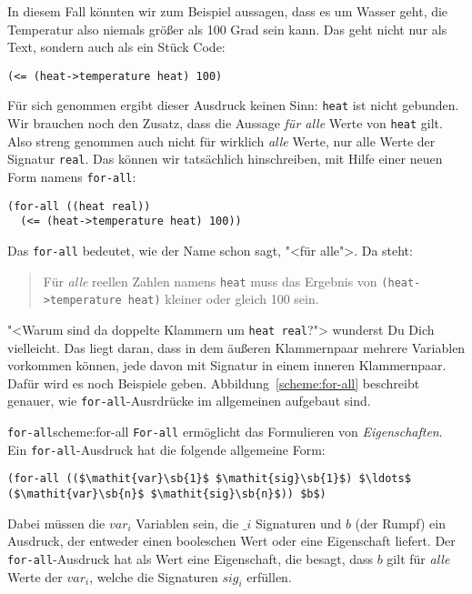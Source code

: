 In diesem Fall könnten wir zum Beispiel aussagen, dass es um Wasser
geht, die Temperatur also niemals größer als 100 Grad sein kann.  Das
geht nicht nur als Text, sondern auch als ein Stück Code:
%
\begin{lstlisting}
(<= (heat->temperature heat) 100)
\end{lstlisting}
%
Für sich genommen ergibt dieser Ausdruck keinen Sinn: \lstinline{heat}
ist nicht gebunden.  Wir brauchen noch den Zusatz, dass die Aussage
\emph{für alle} Werte von \lstinline{heat} gilt.  Also streng genommen
auch nicht für wirklich \emph{alle} Werte, nur alle Werte der Signatur
\lstinline{real}. Das können wir tatsächlich hinschreiben, mit Hilfe
einer neuen Form namens \lstinline{for-all}:
%
\begin{lstlisting}
(for-all ((heat real))
  (<= (heat->temperature heat) 100))
\end{lstlisting}
%
Das \lstinline{for-all} 
bedeutet, wie der Name schon sagt, "<für alle">.  Da steht:
%
\begin{quote}
  Für \emph{alle} reellen Zahlen namens \lstinline{heat} muss das
  Ergebnis von \lstinline{(heat->temperature heat)} kleiner oder
  gleich 100 sein.
\end{quote}
%
"<Warum sind da doppelte Klammern um \lstinline{heat real}?"> wunderst
Du Dich vielleicht.  Das liegt daran, dass in dem äußeren Klammernpaar
mehrere Variablen vorkommen können, jede davon mit Signatur in einem
inneren Klammernpaar.  Dafür wird es noch Beispiele geben.
Abbildung~\ref{scheme:for-all} beschreibt genauer, wie
\lstinline{for-all}-Ausrdrücke im allgemeinen aufgebaut sind.

\begin{feature}{\lstinline{for-all}}{scheme:for-all}
  \lstinline{For-all} ermöglicht das
  Formulieren von \textit{Eigenschaften}.  Ein
  \lstinline{for-all}-Ausdruck hat die folgende allgemeine Form:
%
\begin{lstlisting}
(for-all (($\mathit{var}\sb{1}$ $\mathit{sig}\sb{1}$) $\ldots$ ($\mathit{var}\sb{n}$ $\mathit{sig}\sb{n}$)) $b$)
\end{lstlisting}
%
Dabei müssen die $\mathit{var}_i$ Variablen sein, die $\_i$ Signaturen und $b$ (der
Rumpf) ein Ausdruck, der entweder einen booleschen Wert oder eine
Eigenschaft liefert.  Der \lstinline{for-all}-Ausdruck hat als Wert eine
Eigenschaft, die besagt, dass $b$ gilt für \emph{alle} Werte der
$\mathit{var}_i$, welche die Signaturen $\mathit{sig}_i$ erfüllen.
\end{feature}

